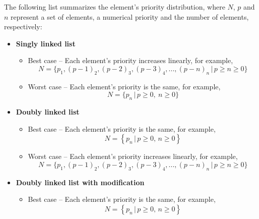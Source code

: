 \documentclass[a4paper,11pt]{kth-mag}
\newcommand*{\skippara}{\par\vspace{\baselineskip} \noindent}
\begin{document}
\skippara The following list summarizes the element's priority distribution, where $N$, $p$ and $n$ represent a set of elements, a numerical priority and the number of elements, respectively:
\clearpage
\begin{itemize}
    \item \textbf{Singly linked list}
        \begin{itemize}
            \item Best case -- Each element's priority increases linearly, for example,
                \begin{equation*}
                    N = \Big\{p_1, (p-1)_2, (p-2)_3, (p-3)_4,...,(p-n)_n \, \Big| \, p \ge n \ge 0 \Big\}
                \end{equation*}
            \item Worst case -- Each element's priority is the same, for example,
                \begin{equation*}
                    N = \Big\{p_{n} \, \Big| \, p \ge 0,\ n \ge 0 \Big\}
                \end{equation*}
        \end{itemize}
    \item \textbf{Doubly linked list}
        \begin{itemize}
            \item Best case -- Each element's priority is the same, for example,
                \begin{equation*}
                    N = \left\{p_{n} \, \Big| \, p \ge 0,\, n \ge 0 \right\}
                \end{equation*}
            \item Worst case -- Each element's priority increases linearly, for example,
                \begin{equation*}
                    N = \Big\{p_1, (p-1)_2, (p-2)_3, (p-3)_4,...,(p-n)_n \, \Big| \, p \ge n\ge 0 \Big\}
                \end{equation*}
        \end{itemize}
    \item \textbf{Doubly linked list with modification}
        \begin{itemize}
            \item Best case -- Each element's priority is the same, for example,
                \begin{equation*}
                    N = \left\{p_{n} \, \Big| \, p \ge 0,\, n \ge 0 \right\}
                \end{equation*}

\end{itemize}
\end{itemize}
\end{document}
